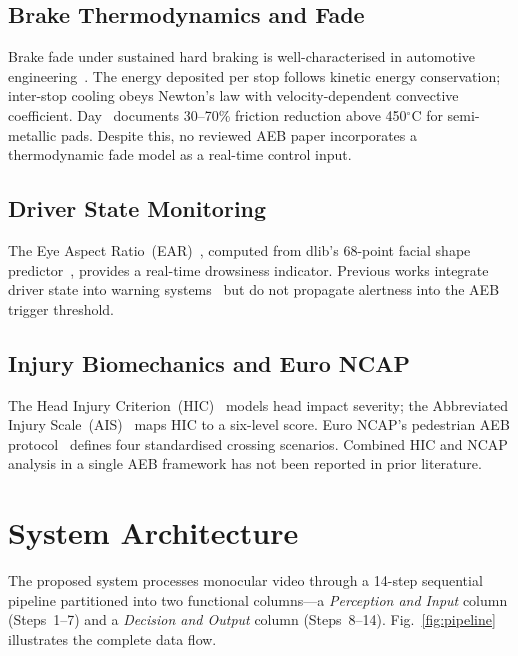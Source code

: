 \documentclass[journal]{IEEEtran}
\begin{document}
\subsection{Brake Thermodynamics and Fade}
Brake fade under sustained hard braking is well-characterised in
automotive engineering~\cite{day2014,tirovic2007}.
The energy deposited per stop follows kinetic energy conservation;
inter-stop cooling obeys Newton's law with velocity-dependent convective
coefficient.
Day~\cite{day2014} documents 30--70\% friction reduction above 450$^\circ$C
for semi-metallic pads.
Despite this, no reviewed AEB paper incorporates a thermodynamic fade
model as a real-time control input.

\subsection{Driver State Monitoring}
The Eye Aspect Ratio~(EAR)~\cite{soukupova2016}, computed from dlib's
68-point facial shape predictor~\cite{king2009}, provides a real-time
drowsiness indicator.
Previous works integrate driver state into warning systems~\cite{dua2013}
but do not propagate alertness into the AEB trigger threshold.

\subsection{Injury Biomechanics and Euro NCAP}
The Head Injury Criterion~(HIC)~\cite{versace1971} models head impact
severity; the Abbreviated Injury Scale~(AIS)~\cite{aaam2016} maps HIC
to a six-level score.
Euro NCAP's pedestrian AEB protocol~\cite{euroncap2022} defines four
standardised crossing scenarios.
Combined HIC and NCAP analysis in a single AEB framework has not been
reported in prior literature.

\section{System Architecture}
\label{sec:arch}

The proposed system processes monocular video through a 14-step
sequential pipeline partitioned into two functional columns---a
\emph{Perception and Input} column (Steps~1--7) and a
\emph{Decision and Output} column (Steps~8--14).
Fig.~\ref{fig:pipeline} illustrates the complete data flow.
\end{document}
